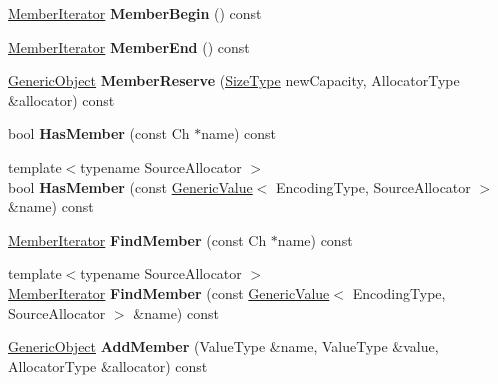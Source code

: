 \begin{DoxyCompactItemize}
\item 
\hyperlink{classGenericMemberIterator}{Member\+Iterator} {\bfseries Member\+Begin} () const \hypertarget{classGenericObject_abf56b2ac9cface0dffd21b541acb9511}{}\label{classGenericObject_abf56b2ac9cface0dffd21b541acb9511}

\item 
\hyperlink{classGenericMemberIterator}{Member\+Iterator} {\bfseries Member\+End} () const \hypertarget{classGenericObject_a7dedae79a478db0aeb4e01df4c788f3a}{}\label{classGenericObject_a7dedae79a478db0aeb4e01df4c788f3a}

\item 
\hyperlink{classGenericObject}{Generic\+Object} {\bfseries Member\+Reserve} (\hyperlink{rapidjson_8h_a5ed6e6e67250fadbd041127e6386dcb5}{Size\+Type} new\+Capacity, Allocator\+Type \&allocator) const \hypertarget{classGenericObject_ae3b031d6df53942eb8909ed914641e00}{}\label{classGenericObject_ae3b031d6df53942eb8909ed914641e00}

\item 
bool {\bfseries Has\+Member} (const Ch $\ast$name) const \hypertarget{classGenericObject_a545cbb3d1e99a48fd7a40ebeac1d10da}{}\label{classGenericObject_a545cbb3d1e99a48fd7a40ebeac1d10da}

\item 
{\footnotesize template$<$typename Source\+Allocator $>$ }\\bool {\bfseries Has\+Member} (const \hyperlink{classGenericValue}{Generic\+Value}$<$ Encoding\+Type, Source\+Allocator $>$ \&name) const \hypertarget{classGenericObject_a946712fa1b4fc9ab551a63d17d671f47}{}\label{classGenericObject_a946712fa1b4fc9ab551a63d17d671f47}

\item 
\hyperlink{classGenericMemberIterator}{Member\+Iterator} {\bfseries Find\+Member} (const Ch $\ast$name) const \hypertarget{classGenericObject_a6713425c66b7f05e4ac5d251a8f5b708}{}\label{classGenericObject_a6713425c66b7f05e4ac5d251a8f5b708}

\item 
{\footnotesize template$<$typename Source\+Allocator $>$ }\\\hyperlink{classGenericMemberIterator}{Member\+Iterator} {\bfseries Find\+Member} (const \hyperlink{classGenericValue}{Generic\+Value}$<$ Encoding\+Type, Source\+Allocator $>$ \&name) const \hypertarget{classGenericObject_a3eca7c61d4d2b728de83ffdb1f35e45a}{}\label{classGenericObject_a3eca7c61d4d2b728de83ffdb1f35e45a}

\item 
\hyperlink{classGenericObject}{Generic\+Object} {\bfseries Add\+Member} (Value\+Type \&name, Value\+Type \&value, Allocator\+Type \&allocator) const \hypertarget{classGenericObject_a59554f8232c7c2a74d8043f4b4b20ec2}{}\label{classGenericObject_a59554f8232c7c2a74d8043f4b4b20ec2}


\end{DoxyCompactItemize}
